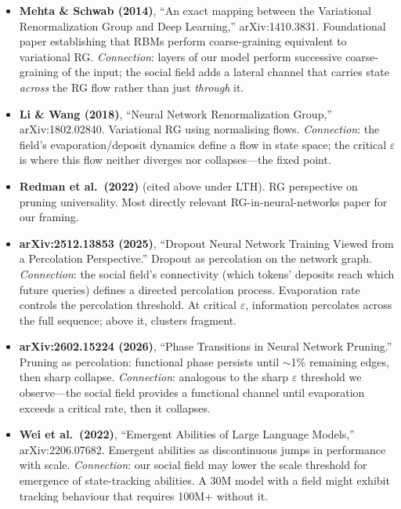 \documentclass[11pt,a4paper]{article}
\begin{document}
\begin{itemize}
    \item \textbf{Mehta \& Schwab (2014)}, ``An exact mapping between
          the Variational Renormalization Group and Deep Learning,''
          arXiv:1410.3831.  Foundational paper establishing that RBMs
          perform coarse-graining equivalent to variational RG.
          \emph{Connection}: layers of our model perform successive
          coarse-graining of the input; the social field adds a lateral
          channel that carries state \emph{across} the RG flow rather
          than just \emph{through} it.

    \item \textbf{Li \& Wang (2018)}, ``Neural Network Renormalization
          Group,'' arXiv:1802.02840.  Variational RG using normalising
          flows.  \emph{Connection}: the field's evaporation/deposit
          dynamics define a flow in state space; the critical
          $\varepsilon$ is where this flow neither diverges nor
          collapses---the fixed point.

    \item \textbf{Redman et al.\ (2022)} (cited above under LTH).
          RG perspective on pruning universality.  Most directly relevant
          RG-in-neural-networks paper for our framing.

    \item \textbf{arXiv:2512.13853 (2025)}, ``Dropout Neural Network
          Training Viewed from a Percolation Perspective.''  Dropout as
          percolation on the network graph.  \emph{Connection}: the
          social field's connectivity (which tokens' deposits reach which
          future queries) defines a directed percolation process.
          Evaporation rate controls the percolation threshold.  At
          critical $\varepsilon$, information percolates across the full
          sequence; above it, clusters fragment.

    \item \textbf{arXiv:2602.15224 (2026)}, ``Phase Transitions in
          Neural Network Pruning.''  Pruning as percolation: functional
          phase persists until $\sim$1\% remaining edges, then sharp
          collapse.  \emph{Connection}: analogous to the sharp
          $\varepsilon$ threshold we observe---the social field provides
          a functional channel until evaporation exceeds a critical rate,
          then it collapses.

    \item \textbf{Wei et al.\ (2022)}, ``Emergent Abilities of Large
          Language Models,'' arXiv:2206.07682.  Emergent abilities as
          discontinuous jumps in performance with scale.
          \emph{Connection}: our social field may lower the scale
          threshold for emergence of state-tracking abilities.  A 30M
          model with a field might exhibit tracking behaviour that
          requires 100M+ without it.


\end{itemize}
\end{document}
